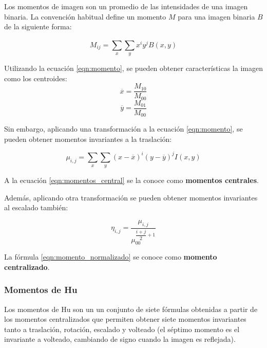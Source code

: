 Los momentos de imagen son un promedio de las intensidades de una imagen binaria. La convención habitual define un momento \(M\) para una imagen binaria \(B\) de la siguiente forma:

\begin{equation}
	\label{eqn:momento}
	M_{ij} = \sum_{x}^{} \sum_{y}^{} x^{i} y^{j} B(x,y)
\end{equation}

Utilizando la ecuación \ref{eqn:momento}, se pueden obtener características la imagen como los centroides:
\begin{equation}
	\label{eqn:momentos_x_centroide}
	\overline{x} = \dfrac{M_{10}}{M_{00}}
\end{equation}
\begin{equation}
	\label{eqn:momentos_y_centroide}
	\overline{y} = \dfrac{M_{01}}{M_{00}}
\end{equation}

Sin embargo, aplicando una transformación a la ecuación \ref{eqn:momento}, se pueden obtener momentos invariantes a la traslación:

\begin{equation}
	\label{eqn:momentos_central}
	\mu_{i,j} = \sum_{x} \sum_{y} (x-\overline{x})^{i} (y-\overline{y})^{j} I(x,y)
\end{equation}

A la ecuación \ref{eqn:momentos_central} se la conoce como \textbf{momentos centrales}.

Además, aplicando otra transformación se pueden obtener momentos invariantes al escalado también:

\begin{equation}
	\label{eqn:momento_normalizado}
	\eta_{i,j} = \dfrac{\mu_{i,j}}{\mu_{00}^{\dfrac{i+j}{2}+1}}
\end{equation}

La fórmula \ref{eqn:momento_normalizado} se conoce como \textbf{momento centralizado}.

\subsubsection{Momentos de Hu}

Los momentos de Hu \cite{1057692} son un un conjunto de siete fórmulas obtenidas a partir de los momentos centralizados que permiten obtener siete momentos invariantes tanto a traslación, rotación, escalado y volteado (el séptimo momento es el invariante a volteado, cambiando de signo cuando la imagen es reflejada).


